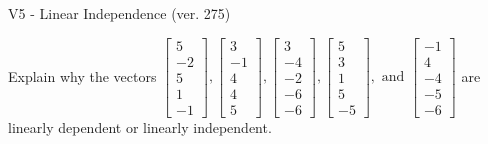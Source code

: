\begin{exercise}
  \begin{exerciseTitle}V5 - Linear Independence (ver. 275)\end{exerciseTitle}
  \begin{exerciseStatement}
    Explain why the vectors \(\left[\begin{array}{r}
5 \\
-2 \\
5 \\
1 \\
-1
\end{array}\right] , \left[\begin{array}{r}
3 \\
-1 \\
4 \\
4 \\
5
\end{array}\right] , \left[\begin{array}{r}
3 \\
-4 \\
-2 \\
-6 \\
-6
\end{array}\right] , \left[\begin{array}{r}
5 \\
3 \\
1 \\
5 \\
-5
\end{array}\right] , \text{ and } \left[\begin{array}{r}
-1 \\
4 \\
-4 \\
-5 \\
-6
\end{array}\right]\) are linearly dependent or linearly independent.	



\end{exerciseStatement}
\end{exercise}

